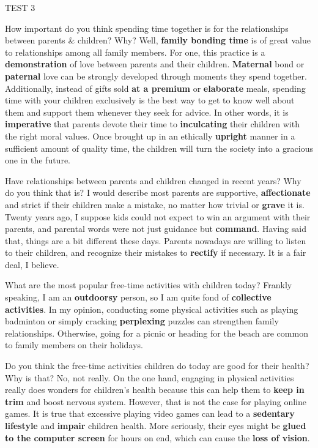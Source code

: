\begin{glossarymc}[Cambridge 10]
\begin{test}{TEST 3}
    \begin{qa}{How important do you think spending time together is for the relationships between parents \& children? Why?}
    Well, \textbf{family bonding time} is of great value to relationships among all family members. For one, this practice is a \textbf{demonstration} of love between parents and their children. \textbf{Maternal} bond or \textbf{paternal} love can be strongly developed through moments they spend together. Additionally, instead of gifts sold \textbf{at a premium} or \textbf{elaborate} meals, spending time with your children exclusively is the best way to get to know well about them and support them whenever they seek for advice. In other words, it is \textbf{imperative} that parents devote their time to \textbf{inculcating} their children with the right moral values. Once brought up in an ethically \textbf{upright} manner in a sufficient amount of quality time, the children will turn the society into a gracious one in the future.
    \end{qa}

    \begin{qa}{Have relationships between parents and children changed in recent years? Why do you think that is?}
    I would describe most parents are supportive, \textbf{affectionate} and strict if their children make a mistake, no matter how trivial or \textbf{grave} it is. Twenty years ago, I suppose kids could not expect to win an argument with their parents, and parental words were not just guidance but \textbf{command}. Having said that, things are a bit different these days. Parents nowadays are willing to listen to their children, and recognize their mistakes to \textbf{rectify} if necessary. It is a fair deal, I believe.
    \end{qa}

    \begin{qa}{What are the most popular free-time activities with children today?}
    Frankly speaking, I am an \textbf{outdoorsy} person, so I am quite fond of \textbf{collective activities}. In my opinion, conducting some physical activities such as playing badminton or simply cracking \textbf{perplexing} puzzles can strengthen family relationships. Otherwise, going for a picnic or heading for the beach are common to family members on their holidays.
    \end{qa}

    \begin{qa}{Do you think the free-time activities children do today are good for their health? Why is that?}
    No, not really. On the one hand, engaging in physical activities really does wonders for children's health because this can help them to \textbf{keep in trim} and boost nervous system. However, that is not the case for playing online games. It is true that excessive playing video games can lead to a \textbf{sedentary lifestyle} and \textbf{impair} children health. More seriously, their eyes might be \textbf{glued to the computer screen} for hours on end, which can cause the \textbf{loss of vision}.
    \end{qa}


\end{test}
\end{glossarymc}
